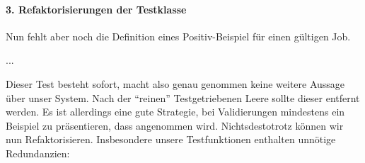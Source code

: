 \paragraph{3. Refaktorisierungen der Testklasse}
Nun fehlt aber noch die Definition eines Positiv-Beispiel für einen gültigen Job.

\begin{ruby}[label=test/unit/job\_test.rb]
...
  
          
   
\end{ruby}
\tddgreen
Dieser Test besteht sofort, macht also genau genommen keine weitere Aussage über unser System. Nach der "`reinen"' Testgetriebenen Leere sollte dieser entfernt werden. Es ist allerdings eine gute Strategie, bei Validierungen mindestens ein Beispiel zu präsentieren, dass angenommen wird. Nichtsdestotrotz können wir nun Refaktorisieren. Insbesondere unsere Testfunktionen enthalten unnötige Redundanzien:

